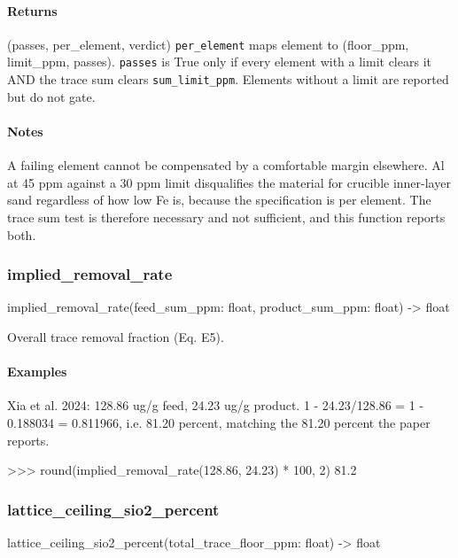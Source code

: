 \documentclass[10pt,a4paper,twoside]{report}
\begin{document}
\paragraph*{Returns}

(passes, per\_element, verdict) \texttt{per\_element} maps element to (floor\_ppm, limit\_ppm, passes). \texttt{passes} is True only if every element with a limit clears it AND the trace sum clears \texttt{sum\_limit\_ppm}. Elements without a limit are reported but do not gate.

\paragraph*{Notes}

A failing element cannot be compensated by a comfortable margin elsewhere. Al at 45 ppm against a 30 ppm limit disqualifies the material for crucible inner-layer sand regardless of how low Fe is, because the specification is per element. The trace sum test is therefore necessary and not sufficient, and this function reports both.

\subsubsection*{implied\_removal\_rate}

\begin{verbatimsmall}
implied_removal_rate(feed_sum_ppm: float, product_sum_ppm: float) -> float
\end{verbatimsmall}

Overall trace removal fraction (Eq. E5).

\paragraph*{Examples}

Xia et al. 2024: 128.86 ug/g feed, 24.23 ug/g product. 1 - 24.23/128.86 = 1 - 0.188034 = 0.811966, i.e. 81.20 percent, matching the 81.20 percent the paper reports.

\begin{doctestblock}
>>> round(implied_removal_rate(128.86, 24.23) * 100, 2)
81.2
\end{doctestblock}

\subsubsection*{lattice\_ceiling\_sio2\_percent}

\begin{verbatimsmall}
lattice_ceiling_sio2_percent(total_trace_floor_ppm: float) -> float
\end{verbatimsmall}
\end{document}
